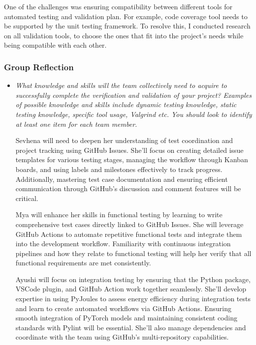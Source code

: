 \documentclass[12pt, titlepage]{article}
\begin{document}
\begin{appendices}
\begin{itemize}
\begin{itemize}
    One of the challenges was ensuring compatibility between different tools for automated testing and validation plan. For example, code coverage tool needs to be supported by the unit testing framework. To resolve this, I conducted research on all validation tools, to choose the ones that fit into the project's needs while being compatible with each other.

\end{itemize}

\subsubsection*{Group Reflection}
\begin{itemize}
  \item \textit{What knowledge and skills will the team collectively need to acquire to
  successfully complete the verification and validation of your project?
  Examples of possible knowledge and skills include dynamic testing knowledge,
  static testing knowledge, specific tool usage, Valgrind etc.  You should look to
  identify at least one item for each team member.\\} 
  
  Sevhena will need to deepen her understanding of test coordination and project 
  tracking using GitHub Issues. She’ll focus on creating detailed issue templates 
  for various testing stages, managing the workflow through Kanban boards, and using 
  labels and milestones effectively to track progress. Additionally, mastering test 
  case documentation and ensuring efficient communication through GitHub’s discussion 
  and comment features will be critical.

  Mya will enhance her skills in functional testing by learning to write comprehensive 
  test cases directly linked to GitHub Issues. She will leverage GitHub Actions to 
  automate repetitive functional tests and integrate them into the development workflow. 
  Familiarity with continuous integration pipelines and how they relate to functional 
  testing will help her verify that all functional requirements are met consistently.

  Ayushi will focus on integration testing by ensuring that the Python package, VSCode 
  plugin, and GitHub Action work together seamlessly. She’ll develop expertise in using 
  PyJoules to assess energy efficiency during integration tests and learn to create 
  automated workflows via GitHub Actions. Ensuring smooth integration of PyTorch models 
  and maintaining consistent coding standards with Pylint will be essential. She’ll 
  also manage dependencies and coordinate with the team using GitHub’s multi-repository 
  capabilities.


\end{itemize}
\end{itemize}
\end{appendices}
\end{document}
